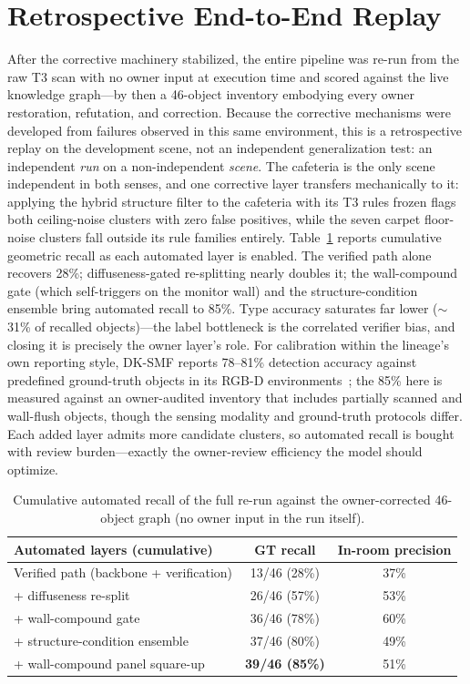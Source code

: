 \section{Retrospective End-to-End Replay}
\label{sec:exp-endtoend}

After the corrective machinery stabilized, the entire pipeline was re-run from
the raw T3 scan with no owner input at execution time and scored against the
live knowledge graph---by then a 46-object inventory embodying every owner
restoration, refutation, and correction. Because the corrective mechanisms were
developed from failures observed in this same environment, this is a
retrospective replay on the development scene, not an independent
generalization test: an independent \emph{run} on a non-independent
\emph{scene}. The cafeteria is the only scene independent in both senses, and
one corrective layer transfers mechanically to it: applying the hybrid
structure filter to the cafeteria with its T3 rules frozen flags both
ceiling-noise clusters with zero false positives, while the seven carpet
floor-noise clusters fall outside its rule families entirely.
Table~\ref{tab:layers} reports cumulative geometric recall as each automated
layer is enabled. The verified path alone recovers 28\%; diffuseness-gated
re-splitting nearly doubles it; the wall-compound gate (which self-triggers on
the monitor wall) and the structure-condition ensemble bring automated recall
to 85\%. Type accuracy saturates far lower ($\sim$31\% of recalled
objects)---the label bottleneck is the correlated verifier bias, and closing
it is precisely the owner layer's role. For calibration within the lineage's
own reporting style, DK-SMF reports 78--81\% detection accuracy against
predefined ground-truth objects in its RGB-D environments~\cite{joo2025dksmf};
the 85\% here is measured against an owner-audited inventory that includes
partially scanned and wall-flush objects, though the sensing modality and
ground-truth protocols differ. Each added layer admits more candidate
clusters, so automated recall is bought with review burden---exactly the
owner-review efficiency the model should optimize.

\begin{table}[htbp]
\centering
\caption{Cumulative automated recall of the full re-run against the
owner-corrected 46-object graph (no owner input in the run itself).}
\label{tab:layers}
\begin{tabular}{l c c}
\toprule
\textbf{Automated layers (cumulative)} & \textbf{GT recall} & \textbf{In-room precision} \\
\midrule
Verified path (backbone + verification) & 13/46 (28\%) & 37\% \\
+ diffuseness re-split & 26/46 (57\%) & 53\% \\
+ wall-compound gate & 36/46 (78\%) & 60\% \\
+ structure-condition ensemble & 37/46 (80\%) & 49\% \\
+ wall-compound panel square-up & \textbf{39/46 (85\%)} & 51\% \\
\bottomrule
\end{tabular}
\end{table}

